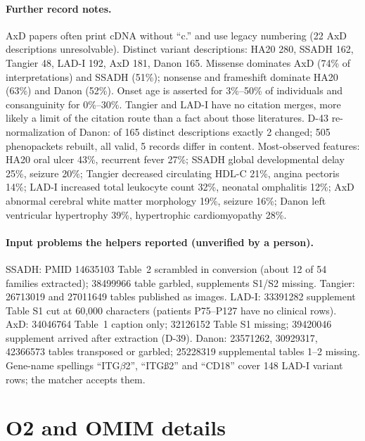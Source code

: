 \documentclass{article} %
\begin{document}
\paragraph{Further record notes.} AxD papers often print cDNA without ``c.'' and use legacy numbering (22 AxD descriptions unresolvable). Distinct variant descriptions: HA20 280, SSADH 162, Tangier 48, LAD-I 192, AxD 181, Danon 165. Missense dominates AxD (74\% of interpretations) and SSADH (51\%); nonsense and frameshift dominate HA20 (63\%) and Danon (52\%). Onset age is asserted for 3\%--50\% of individuals and consanguinity for 0\%--30\%. Tangier and LAD-I have no citation merges, more likely a limit of the citation route than a fact about those literatures. D-43 re-normalization of Danon: of 165 distinct descriptions exactly 2 changed; 505 phenopackets rebuilt, all valid, 5 records differ in content. Most-observed features: HA20 oral ulcer 43\%, recurrent fever 27\%; SSADH global developmental delay 25\%, seizure 20\%; Tangier decreased circulating HDL-C 21\%, angina pectoris 14\%; LAD-I increased total leukocyte count 32\%, neonatal omphalitis 12\%; AxD abnormal cerebral white matter morphology 19\%, seizure 16\%; Danon left ventricular hypertrophy 39\%, hypertrophic cardiomyopathy 28\%.

\paragraph{Input problems the helpers reported (unverified by a person).} SSADH: PMID 14635103 Table~2 scrambled in conversion (about 12 of 54 families extracted); 38499966 table garbled, supplements S1/S2 missing. Tangier: 26713019 and 27011649 tables published as images. LAD-I: 33391282 supplement Table S1 cut at 60,000 characters (patients P75--P127 have no clinical rows). AxD: 34046764 Table~1 caption only; 32126152 Table S1 missing; 39420046 supplement arrived after extraction (D-39). Danon: 23571262, 30929317, 42366573 tables transposed or garbled; 25228319 supplemental tables 1--2 missing. Gene-name spellings ``ITG$\beta$2'', ``ITG\ss{}2'' and ``CD18'' cover 148 LAD-I variant rows; the matcher accepts them.

\section{O2 and OMIM details}
\label{app:o2}
\end{document}
